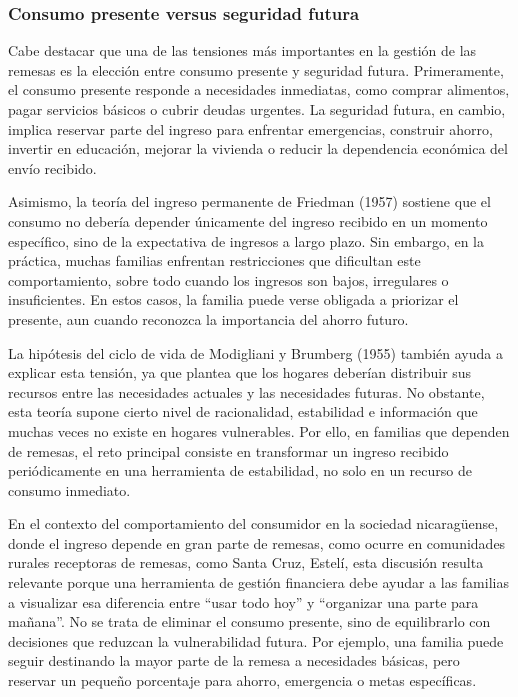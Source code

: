 \documentclass[12pt,letterpaper]{article}
\begin{document}
\subsubsection{\texorpdfstring{\textbf{Consumo presente versus seguridad futura}}{Consumo presente versus seguridad futura}}\label{consumo-presente-versus-seguridad-futura}

Cabe destacar que una de las tensiones más importantes en la gestión de las remesas es la elección entre consumo presente y seguridad futura. Primeramente, el consumo presente responde a necesidades inmediatas, como comprar alimentos, pagar servicios básicos o cubrir deudas urgentes. La seguridad futura, en cambio, implica reservar parte del ingreso para enfrentar emergencias, construir ahorro, invertir en educación, mejorar la vivienda o reducir la dependencia económica del envío recibido.

Asimismo, la teoría del ingreso permanente de Friedman (1957) sostiene que el consumo no debería depender únicamente del ingreso recibido en un momento específico, sino de la expectativa de ingresos a largo plazo. Sin embargo, en la práctica, muchas familias enfrentan restricciones que dificultan este comportamiento, sobre todo cuando los ingresos son bajos, irregulares o insuficientes. En estos casos, la familia puede verse obligada a priorizar el presente, aun cuando reconozca la importancia del ahorro futuro.

La hipótesis del ciclo de vida de Modigliani y Brumberg (1955) también ayuda a explicar esta tensión, ya que plantea que los hogares deberían distribuir sus recursos entre las necesidades actuales y las necesidades futuras. No obstante, esta teoría supone cierto nivel de racionalidad, estabilidad e información que muchas veces no existe en hogares vulnerables. Por ello, en familias que dependen de remesas, el reto principal consiste en transformar un ingreso recibido periódicamente en una herramienta de estabilidad, no solo en un recurso de consumo inmediato.

En el contexto del comportamiento del consumidor en la sociedad nicaragüense, donde el ingreso depende en gran parte de remesas, como ocurre en comunidades rurales receptoras de remesas, como Santa Cruz, Estelí, esta discusión resulta relevante porque una herramienta de gestión financiera debe ayudar a las familias a visualizar esa diferencia entre ``usar todo hoy'' y ``organizar una parte para mañana''. No se trata de eliminar el consumo presente, sino de equilibrarlo con decisiones que reduzcan la vulnerabilidad futura. Por ejemplo, una familia puede seguir destinando la mayor parte de la remesa a necesidades básicas, pero reservar un pequeño porcentaje para ahorro, emergencia o metas específicas.
\end{document}
